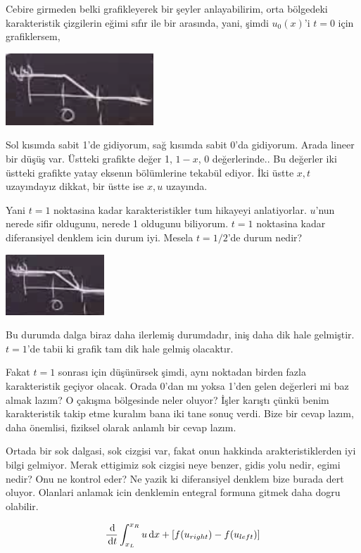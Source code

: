 \documentclass[12pt,fleqn]{article}\usepackage{../../common}
\begin{document}
Cebire girmeden belki grafikleyerek bir şeyler anlayabilirim, orta bölgedeki
karakteristik çizgilerin eğimi sıfır ile bir arasında, yani, şimdi $u_0(x)$'i
$t=0$ için grafiklersem,

\includegraphics[width=15em]{compscieng_2_08_02.png}

Sol kısımda sabit 1'de gidiyorum, sağ kısımda sabit 0'da gidiyorum. Arada
lineer bir düşüş var. Üstteki grafikte değer 1, $1-x$, 0 değerlerinde..
Bu değerler iki üstteki grafikte yatay eksenın bölümlerine tekabül ediyor.
İki üstte $x,t$ uzayındayız dikkat, bir üstte ise $x,u$ uzayında.

Yani $t=1$ noktasina kadar karakteristikler tum hikayeyi anlatiyorlar.  $u$'nun
nerede sifir oldugunu, nerede 1 oldugunu biliyorum. $t=1$ noktasina kadar
diferansiyel denklem icin durum iyi. Mesela $t=1/2$'de durum nedir? 

\includegraphics[width=10em]{compscieng_2_08_03.png}

Bu durumda dalga biraz daha ilerlemiş durumdadır, iniş daha dik hale gelmiştir.
$t=1$'de tabii ki grafik tam dik hale gelmiş olacaktır.

Fakat $t=1$ sonrası için düşünürsek şimdi, aynı noktadan birden fazla
karakteristik geçiyor olacak. Orada 0'dan mı yoksa 1'den gelen değerleri mi baz
almak lazım? O çakışma bölgesinde neler oluyor? İşler karıştı çünkü benim
karakteristik takip etme kuralım bana iki tane sonuç verdi. Bize bir cevap
lazım, daha önemlisi, fiziksel olarak anlamlı bir cevap lazım.

Ortada bir sok dalgasi, sok cizgisi var, fakat onun hakkinda arakteristiklerden
iyi bilgi gelmiyor. Merak ettigimiz sok cizgisi neye benzer, gidis yolu nedir,
egimi nedir? Onu ne kontrol eder? Ne yazik ki diferansiyel denklem bize burada
dert oluyor. Olanlari anlamak icin denklemin entegral formuna gitmek daha dogru
olabilir.

$$
\frac{\,\mathrm{d}}{\,\mathrm{d} t} \int_{x_L}^{x_R}
u \,\mathrm{d} x + \left[ f(u_{right}) - f(u_{left})  \right]
$$
\end{document}
